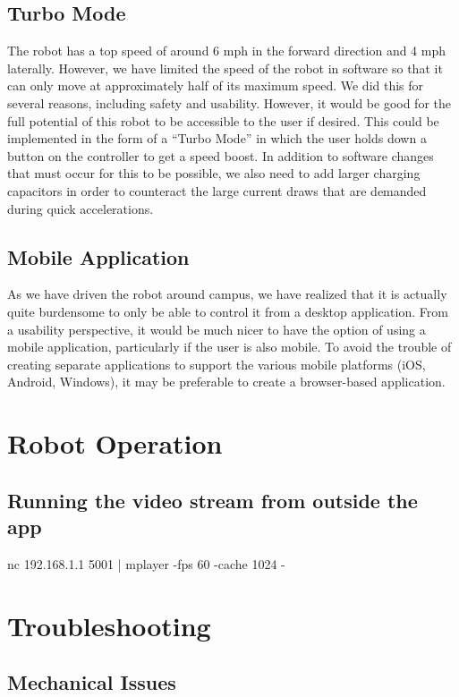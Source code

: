 \documentclass[letterpaper,12pt]{report}
\begin{document}
\section{Turbo Mode}
The robot has a top speed of around 6 mph in the forward direction and 4 mph
laterally. However, we have limited the speed of the robot in software so that
it can only move at approximately half of its maximum speed. We did this for
several reasons, including safety and usability. However, it would be good for
the full potential of this robot to be accessible to the user if desired. This
could be implemented in the form of a ``Turbo Mode'' in which the user holds
down a button on the controller to get a speed boost. In addition to software
changes that must occur for this to be possible, we also need to add larger
charging capacitors in order to counteract the large current draws that are
demanded during quick accelerations.

\section{Mobile Application}
As we have driven the robot around campus, we have realized that it is actually
quite burdensome to only be able to control it from a desktop application. From
a usability perspective, it would be much nicer to have the option of using a
mobile application, particularly if the user is also mobile. To avoid the
trouble of creating separate applications to support the various mobile
platforms (iOS, Android, Windows), it may be preferable to create a
browser-based application.

\chapter{Robot Operation}

\section{Running the video stream from outside the app}
nc 192.168.1.1 5001 | mplayer -fps 60 -cache 1024 -

\chapter{Troubleshooting}

\section{Mechanical Issues}
\end{document}
